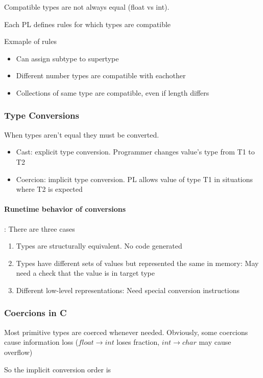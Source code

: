 \documentclass{article}
\begin{document}
Compatible types are not always equal (float vs int).

Each PL defines rules for which types are compatible

Exmaple of rules
\begin{itemize}
  \item Can assign subtype to supertype
  \item Different number types are compatible with eachother
  \item Collections of same type are compatible, even if length differs
\end{itemize}

\subsubsection{Type Conversions}
When types aren't equal they must be converted.

\begin{itemize}
  \item Cast: explicit type conversion. Programmer changes value's type from T1 to T2
  \item Coercion: implicit type conversion. PL allows value of type T1 in situations where T2 is expected
\end{itemize}

\paragraph{Runetime behavior of conversions}: There are three cases
\begin{enumerate}
  \item Types are structurally equivalent. No code generated
  \item Types have different sets of values but represented the same in memory: May need a check that the value is in target type
  \item Different low-level representations: Need special conversion instructions
\end{enumerate}


\subsubsection{Coercions in C}
Most primitive types are coerced whenever needed. Obviously, some coercions cause information loss ($float \to int$ loses fraction, $int\to char$ may cause overflow)

So the implicit conversion order is 
\end{document}
